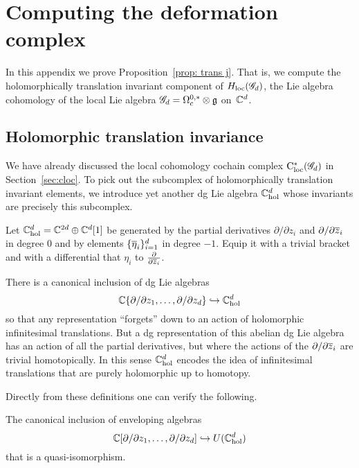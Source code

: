 \appendix

\section{Computing the deformation complex}\label{sec: hol trans}

In this appendix we prove Proposition~\ref{prop: trans j}. 
That is, we compute the holomorphically translation invariant component of $H_{\rm loc}(\sG_d)$, 
the Lie algebra cohomology of the local Lie algebra $\sG_d = \Omega^{0,*}_c \tensor \fg$ on~$\CC^d$. 

\subsection{Holomorphic translation invariance}

We have already discussed the local cohomology cochain complex $\cloc^*(\sG_d)$ in Section~\ref{sec:cloc}.
To pick out the subcomplex of holomorphically translation invariant elements,
we introduce yet another dg Lie algebra $\CC^{d}_{\rm hol}$ whose invariants are precisely this subcomplex.

\begin{dfn}
Let $\CC^{d}_{\rm hol} = \CC^{2d} \oplus \CC^d[1]$ be generated by the partial derivatives $\partial/\partial z_i$ and $\partial/\partial \zbar_i$ in degree 0 and by elements $\{\Bar{\eta}_i\}_{i=1}^d$ in degree $-1$.
Equip it with a trivial bracket and with a differential that $\eta_i$ to $\frac{\partial}{\partial \zbar_i}$.
\end{dfn}

There is a canonical inclusion of dg Lie algebras
\[
\CC\{\partial / \partial z_1, \ldots, \partial / \partial z_d\} \hookrightarrow \CC^{d}_{\rm hol}
\]
so that any representation ``forgets'' down to an action of holomorphic infinitesimal translations.
But a dg representation of this abelian dg Lie algebra has an action of all the partial derivatives,
but where the actions of the $\partial/\partial \zbar_i$ are trivial homotopically.
In this sense $\CC^{d}_{\rm hol}$ encodes the idea of infinitesimal translations that are purely holomorphic up to homotopy.

Directly from these definitions one can verify the following.

\begin{lem}
The canonical inclusion of enveloping algebras
\[
\CC[\partial / \partial z_1, \ldots, \partial / \partial z_d] \hookrightarrow U(\CC^{d}_{\rm hol})
\]
that is a quasi-isomorphism.
\end{lem}

